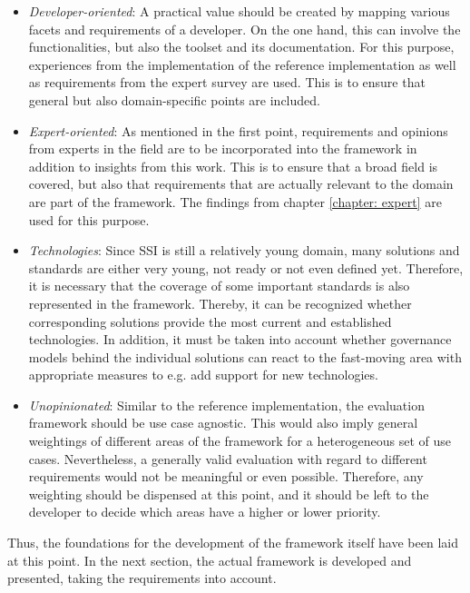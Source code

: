 	\begin{itemize}
	    \item \textit{Developer-oriented}: A practical value should be created by mapping various facets and requirements of a developer. On the one hand, this can involve the functionalities, but also the toolset and its documentation. For this purpose, experiences from the implementation of the reference implementation as well as requirements from the expert survey are used. This is to ensure that general but also domain-specific points are included. %
	    \item \textit{Expert-oriented}: As mentioned in the first point, requirements and opinions from experts in the field are to be incorporated into the framework in addition to insights from this work. This is to ensure that a broad field is covered, but also that requirements that are actually relevant to the domain are part of the framework. The findings from chapter \ref{chapter: expert} are used for this purpose.  %
	    \item \textit{Technologies}: Since \ac{SSI} is still a relatively young domain, many solutions and standards are either very young, not ready or not even defined yet. Therefore, it is necessary that the coverage of some important standards is also represented in the framework. Thereby, it can be recognized whether corresponding solutions provide the most current and established technologies. In addition, it must be taken into account whether governance models behind the individual solutions can react to the fast-moving area with appropriate measures to e.g. add support for new technologies.  %
	    \item \textit{Unopinionated}: Similar to the reference implementation, the evaluation framework should be use case agnostic. This would also imply general weightings of different areas of the framework for a heterogeneous set of use cases. Nevertheless, a generally valid evaluation with regard to different requirements would not be meaningful or even possible. Therefore, any weighting should be dispensed  at this point, and it should be left to the developer to decide which areas have a higher or lower priority.  %
	\end{itemize}
	
	Thus, the foundations for the development of the framework itself have been laid at this point. In the next section, the actual framework is developed and presented, taking the requirements into account.
	
